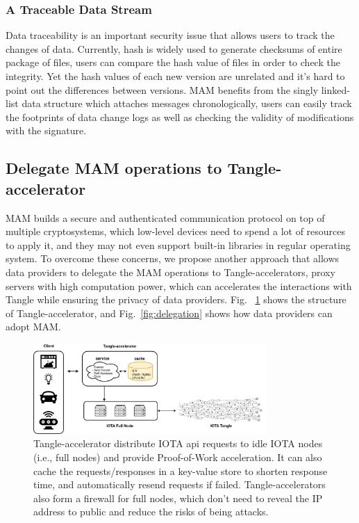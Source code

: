 \documentclass[conference]{IEEEtran}
\begin{document}
\subsubsection{A Traceable Data Stream}
Data traceability is an important security issue that allows users to track the changes of data. Currently, hash is widely used to generate checksums of entire package of files, users can compare the hash value of files in order to check the integrity. Yet the hash values of each new version are unrelated and it's hard to point out the differences between versions. MAM benefits from the singly linked-list data structure which attaches messages chronologically, users can easily track the footprints of data change logs as well as checking the validity of modifications with the signature.

\subsection{Delegate MAM operations to Tangle-accelerator}
\label{section:ta_endpoint}
MAM builds a secure and authenticated communication protocol on top of multiple cryptosystems, which low-level devices need to spend a lot of resources to apply it, and they may not even support built-in libraries in regular operating system. To overcome these concerns, we propose another approach that allows data providers to delegate the MAM operations to Tangle-accelerators, proxy servers with high computation power, which can accelerates the interactions with Tangle while ensuring the privacy of data providers. Fig.~ \ref{fig:ta_struct} shows the structure of Tangle-accelerator, and Fig.~\ref{fig:delegation} shows how data providers can adopt MAM.

\begin{figure}[!t]
    \centering
    \includegraphics[width=3.5in]{ta_structure}
    \caption{Tangle-accelerator distribute IOTA api requests to idle IOTA nodes (i.e., full nodes) and provide Proof-of-Work acceleration. It can also cache the requests/responses in a key-value store to shorten response time, and automatically resend requests if failed. Tangle-accelerators also form a firewall for full nodes, which don't need to reveal the IP address to public and reduce the risks of being attacks.}
    \label{fig:ta_struct}
\end{figure}
\end{document}
